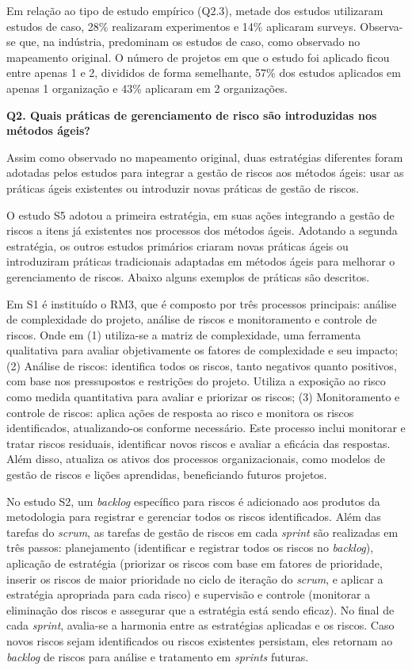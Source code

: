 \documentclass[
	12pt,
	openright,
	twoside,
	a4paper,
	english,
	brazil
	]{abntex2}
\begin{document}
Em relação ao tipo de estudo empírico (Q2.3), metade dos estudos utilizaram estudos de caso, 28\% realizaram experimentos e 14\% aplicaram surveys. Observa-se que, na indústria, predominam os estudos de caso, como observado no mapeamento original.
O número de projetos em que o estudo foi aplicado ficou entre apenas 1 e 2, divididos de forma semelhante, 57\% dos estudos aplicados em apenas 1 organização e 43\% aplicaram em 2 organizações.

\textbf{Q2. Quais práticas de gerenciamento de risco são introduzidas nos métodos ágeis?}

Assim como observado no mapeamento original, duas estratégias diferentes foram adotadas pelos estudos para integrar a gestão de riscos aos métodos ágeis: usar as práticas ágeis existentes ou introduzir novas práticas de gestão de riscos.

O estudo S5 adotou a primeira estratégia, em suas ações integrando a gestão de riscos a itens já existentes nos processos dos métodos ágeis. Adotando a segunda estratégia, os outros estudos primários criaram novas práticas ágeis ou introduziram práticas tradicionais adaptadas em métodos ágeis para melhorar o gerenciamento de riscos. Abaixo alguns exemplos de práticas são descritos.

Em S1 é instituído o RM3, que é composto por três processos principais: análise de complexidade do projeto, análise de riscos e monitoramento e controle de riscos. Onde em (1) utiliza-se a matriz de complexidade, uma ferramenta qualitativa para avaliar objetivamente os fatores de complexidade e seu impacto; (2) Análise de riscos: identifica todos os riscos, tanto negativos quanto positivos, com base nos pressupostos e restrições do projeto. Utiliza a exposição ao risco como medida quantitativa para avaliar e priorizar os riscos; (3) Monitoramento e controle de riscos: aplica ações de resposta ao risco e monitora os riscos identificados, atualizando-os conforme necessário. Este processo inclui monitorar e tratar riscos residuais, identificar novos riscos e avaliar a eficácia das respostas. Além disso, atualiza os ativos dos processos organizacionais, como modelos de gestão de riscos e lições aprendidas, beneficiando futuros projetos.

No estudo S2, um \textit{backlog} específico para riscos é adicionado aos produtos da metodologia para registrar e gerenciar todos os riscos identificados. Além das tarefas do \textit{scrum}, as tarefas de gestão de riscos em cada \textit{sprint} são realizadas em três passos: planejamento (identificar e registrar todos os riscos no \textit{backlog}), aplicação de estratégia (priorizar os riscos com base em fatores de prioridade, inserir os riscos de maior prioridade no ciclo de iteração do \textit{scrum}, e aplicar a estratégia apropriada para cada risco) e supervisão e controle (monitorar a eliminação dos riscos e assegurar que a estratégia está sendo eficaz). No final de cada \textit{sprint}, avalia-se a harmonia entre as estratégias aplicadas e os riscos. Caso novos riscos sejam identificados ou riscos existentes persistam, eles retornam ao \textit{backlog} de riscos para análise e tratamento em \textit{sprints} futuras.
\end{document}
